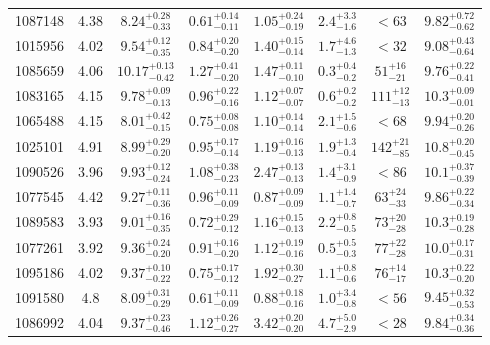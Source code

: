 \begin{table}
\begin{tabular}{c|c|c|c|c|c|c|c}
 1087148 &     4.38 & $8.24^{+0.28}_{-0.33}$  & $0.61^{+0.14}_{-0.11}$ & $1.05^{+0.24}_{-0.19}$ & $2.4^{+3.3}_{-1.6}$  & $<63$  & $9.82^{+0.72}_{-0.62}$ \\
 1015956 &     4.02 & $9.54^{+0.12}_{-0.35}$  & $0.84^{+0.20}_{-0.20}$ & $1.40^{+0.15}_{-0.14}$ & $1.7^{+4.6}_{-1.3}$  & $<32$  & $9.08^{+0.43}_{-0.64}$ \\
 1085659 &     4.06 & $10.17^{+0.13}_{-0.42}$ & $1.27^{+0.41}_{-0.20}$ & $1.47^{+0.11}_{-0.10}$ & $0.3^{+0.4}_{-0.2}$  & $51^{+16}_{-21}$  & $9.76^{+0.22}_{-0.41}$ \\
 1083165 &     4.15 & $9.78^{+0.09}_{-0.13}$  & $0.96^{+0.22}_{-0.16}$ & $1.12^{+0.07}_{-0.07}$ & $0.6^{+0.2}_{-0.2}$  & $111^{+12}_{-13}$ & $10.3^{+0.09}_{-0.01}$ \\
 1065488 &     4.15 & $8.01^{+0.42}_{-0.15}$  & $0.75^{+0.08}_{-0.08}$ & $1.10^{+0.14}_{-0.14}$ & $2.1^{+1.5}_{-0.6}$  & $<68$  & $9.94^{+0.20}_{-0.26}$ \\
 1025101 &     4.91 & $8.99^{+0.29}_{-0.20}$  & $0.95^{+0.17}_{-0.14}$ & $1.19^{+0.16}_{-0.13}$ & $1.9^{+1.3}_{-0.4}$  & $142^{+21}_{-85}$ & $10.8^{+0.20}_{-0.45}$ \\
 1090526 &     3.96 & $9.93^{+0.12}_{-0.24}$  & $1.08^{+0.38}_{-0.23}$ & $2.47^{+0.13}_{-0.13}$ & $1.4^{+3.1}_{-0.9}$  & $<86$  & $10.1^{+0.37}_{-0.39}$ \\
 1077545 &     4.42 & $9.27^{+0.11}_{-0.36}$  & $0.96^{+0.11}_{-0.09}$ & $0.87^{+0.09}_{-0.09}$ & $1.1^{+1.4}_{-0.7}$  & $63^{+24}_{-33}$  & $9.86^{+0.22}_{-0.34}$ \\
 1089583 &     3.93 & $9.01^{+0.16}_{-0.35}$  & $0.72^{+0.29}_{-0.12}$ & $1.16^{+0.15}_{-0.13}$ & $2.2^{+0.8}_{-0.5}$  & $73^{+20}_{-28}$  & $10.3^{+0.19}_{-0.28}$ \\
 1077261 &     3.92 & $9.36^{+0.24}_{-0.20}$  & $0.91^{+0.16}_{-0.20}$ & $1.12^{+0.19}_{-0.16}$ & $0.5^{+0.5}_{-0.3}$  & $77^{+22}_{-28}$  & $10.0^{+0.17}_{-0.31}$ \\
 1095186 &     4.02 & $9.37^{+0.10}_{-0.22}$  & $0.75^{+0.17}_{-0.12}$ & $1.92^{+0.30}_{-0.27}$ & $1.1^{+0.8}_{-0.6}$  & $76^{+14}_{-17}$  & $10.3^{+0.22}_{-0.20}$ \\
 1091580 &     4.8  & $8.09^{+0.31}_{-0.29}$  & $0.61^{+0.11}_{-0.09}$ & $0.88^{+0.18}_{-0.16}$ & $1.0^{+3.4}_{-0.8}$  & $<56$  & $9.45^{+0.32}_{-0.53}$ \\
 1086992 &     4.04 & $9.37^{+0.23}_{-0.46}$  & $1.12^{+0.26}_{-0.27}$ & $3.42^{+0.20}_{-0.20}$ & $4.7^{+5.0}_{-2.9}$  & $<28$   & $9.84^{+0.34}_{-0.36}$ \\

\end{tabular}
\end{table}
